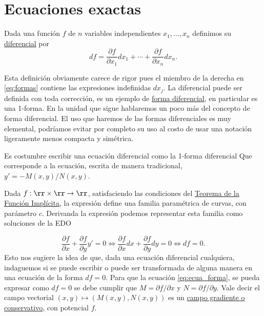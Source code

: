\section{Ecuaciones exactas}



\begin{definicion}[Diferencial]
 Dada una función $f$ de $n$ variables independientes $x_1,\ldots,x_n$ definimos su \href{http://es.wikipedia.org/wiki/Diferencial_de_una_función}{diferencial}
 por
 \begin{equation}\label{eq:formas} df=\frac{\partial f}{\partial x_1}dx_1+\cdots +\frac{\partial f}{\partial x_n}dx_n.
   \end{equation}

 \end{definicion}

 Esta definición obviamente carece de rigor pues el miembro de la derecha en \eqref{eq:formas} contiene las expresiones indefinidas $dx_j$.
La diferencial puede ser definida con toda corrección, es un ejemplo de \href{https://es.wikipedia.org/wiki/Forma_diferencial}{forma diferencial}\link, en particular  es una 1-forma. En la unidad que sigue hablaremos un poco más del concepto de forma diferencial. El uso que haremos de las formas diferenciales es muy elemental, podríamos evitar por completo su uso al costo de usar una notación ligeramente menos compacta y simétrica.

 Es costumbre escribir una ecuación diferencial  como la 1-forma diferencial
Que corresponde a la ecuación, escrita de manera tradicional, \linebreak$y'=-M(x,y)/N(x,y)$.



 Dada $f:\rr\times\rr\to\rr$, satisfaciendo las condiciones del \href{https://es.wikipedia.org/wiki/Teorema_de_la_funci%C3%B3n_impl%C3%ADcita}{Teorema de la Función Implícita}\link, la expresión
define una  familia paramétrica de curvas, con parámetro $c$. Derivanda la expresión podemos representar esta familia como soluciones de la EDO

\[
 \frac{\partial f}{\partial x}+\frac{\partial f}{\partial y}y'=0\Longleftrightarrow \frac{\partial f}{\partial x}dx+\frac{\partial f}{\partial y}dy=0
 \Longleftrightarrow df=0.
\]
 Esto  nos sugiere la idea de que, dada una ecuación diferencial cualquiera, indaguemos si se puede escribir o puede ser transformada de alguna manera en una ecuación de la forma $df=0$.  Para que la ecuación \eqref{eq:ecua_forma}, se pueda expresar como $df=0$ se debe cumplir que  $M=\partial f/\partial x$ y $N=\partial f/\partial y$.
 Vale decir el campo vectorial $(x,y)\mapsto (M(x,y),N(x,y))$ es un \href{http://es.wikipedia.org/wiki/Fuerza_conservativa}{campo
gradiente o conservativo}\link, con potencial $f$.


